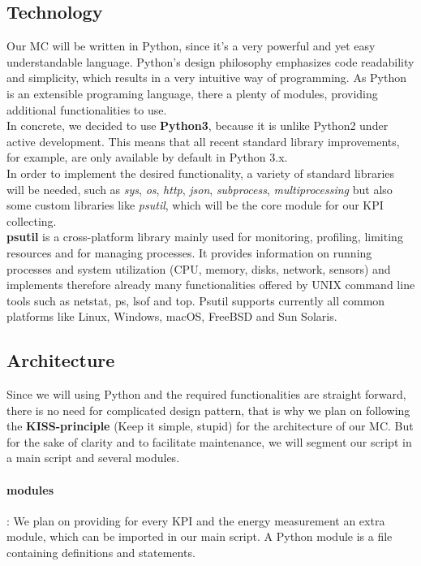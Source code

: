 \documentclass{scrreprt}
\begin{document}
\subsection{Technology}
Our MC will be written in Python, since it's a very powerful and yet easy understandable language. Python's design philosophy emphasizes code readability and simplicity, which results in a very intuitive way of programming. As Python is an extensible programing language, there a plenty of modules, providing additional functionalities to use. \\
In concrete, we decided to use \textbf{Python3}, because it is unlike Python2 under active development. This means that all recent standard library improvements, for example, are only available by default in Python 3.x. \\
In order to implement the desired functionality, a variety of standard libraries will be needed, such as \textit{sys}, \textit{os}, \textit{http}, \textit{json}, \textit{subprocess}, \textit{multiprocessing} but also some custom libraries like \textit{psutil}, which will be the core module for our KPI collecting. \\
\textbf{psutil} is a cross-platform library mainly used for monitoring, profiling, limiting resources and for managing processes. It provides information on running processes and system utilization (CPU, memory, disks, network, sensors) and implements therefore already many functionalities offered by UNIX command line tools such as netstat, ps, lsof and top. Psutil supports currently all common platforms like Linux, Windows, macOS, FreeBSD and Sun Solaris.

\subsection{Architecture}
Since we will using Python and the required functionalities are straight forward, there is no need for complicated design pattern, that is why we plan on following the \textbf{KISS-principle} (Keep it simple, stupid) for the architecture of our MC.  
But for the sake of clarity and to facilitate maintenance, we will segment our script in a main script and several modules.
\paragraph{modules}: We plan on providing for every KPI and the energy measurement an extra module, which can be imported in our main script. A Python module is a file containing definitions and statements. 
\end{document}
